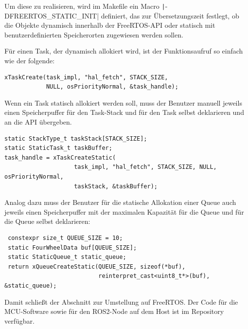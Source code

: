 Um diese zu realisieren, wird im Makefile ein Macro
\texttt|-DFREERTOS_STATIC_INIT| definiert, das zur
Übersetzungszeit festlegt, ob die Objekte dynamisch innerhalb der FreeRTOS-API
oder statisch mit benutzerdefinierten Speicherorten zugewiesen werden sollen.

Für einen Task, der dynamisch allokiert wird, ist der Funktionsaufruf so einfach
wie der folgende:

\begin{code}
\begin{verbatim}
xTaskCreate(task_impl, "hal_fetch", STACK_SIZE,
            NULL, osPriorityNormal, &task_handle);
\end{verbatim}
\end{code}

Wenn ein Task statisch allokiert werden soll, muss der Benutzer manuell jeweils
einen Speicherpuffer für den Task-Stack und für den Task selbst deklarieren und
an die API übergeben.

\begin{code}
\begin{verbatim}
static StackType_t taskStack[STACK_SIZE];
static StaticTask_t taskBuffer;
task_handle = xTaskCreateStatic(
                    task_impl, "hal_fetch", STACK_SIZE, NULL, osPriorityNormal,
                    taskStack, &taskBuffer);
\end{verbatim}
\end{code}

Analog dazu muss der Benutzer für die statische Allokation einer Queue auch
jeweils einen Speicherpuffer mit der maximalen Kapazität für die Queue und für
die Queue selbst deklarieren:

\begin{code}
\begin{verbatim}
 constexpr size_t QUEUE_SIZE = 10;
 static FourWheelData buf[QUEUE_SIZE];
 static StaticQueue_t static_queue;
 return xQueueCreateStatic(QUEUE_SIZE, sizeof(*buf),
                           reinterpret_cast<uint8_t*>(buf), &static_queue);
\end{verbatim}
\end{code}

Damit schließt der Abschnitt zur Umstellung auf FreeRTOS. Der Code für die
MCU-Software sowie für den ROS2-Node auf dem Host ist im
Repository~\cite{mecarover_freertos_profiling} verfügbar.


